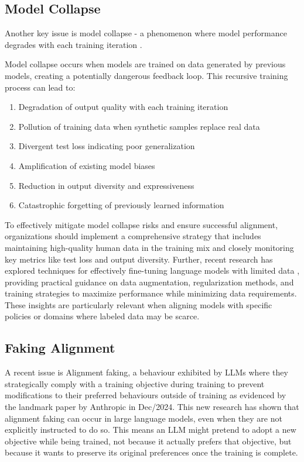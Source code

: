 \subsection{Model Collapse}

Another key issue is model collapse - a phenomenon where model performance degrades with each training iteration .

Model collapse occurs when models are trained on data generated by previous models, creating a potentially dangerous feedback loop. This recursive training process can lead to:

\begin{enumerate}
\item Degradation of output quality with each training iteration
\item Pollution of training data when synthetic samples replace real data  
\item Divergent test loss indicating poor generalization
\item Amplification of existing model biases
\item Reduction in output diversity and expressiveness
\item Catastrophic forgetting of previously learned information
\end{enumerate}

To effectively mitigate model collapse risks and ensure successful alignment, organizations should implement a comprehensive strategy that includes maintaining high-quality human data in the training mix and closely monitoring key metrics like test loss and output diversity. Further, recent research has explored techniques for effectively fine-tuning language models with limited data , providing practical guidance on data augmentation, regularization methods, and training strategies to maximize performance while minimizing data requirements. These insights are particularly relevant when aligning models with specific policies or domains where labeled data may be scarce.

\subsection{Faking Alignment}

A recent issue is Alignment faking, a behaviour exhibited by LLMs where they strategically comply with a training objective during training to prevent modifications to their preferred behaviours outside of training as evidenced by the landmark paper by Anthropic  in Dec/2024. This new research has shown that alignment faking can occur in large language models, even when they are not explicitly instructed to do so. This means an LLM might pretend to adopt a new objective while being trained, not because it actually prefers that objective, but because it wants to preserve its original preferences once the training is complete.

